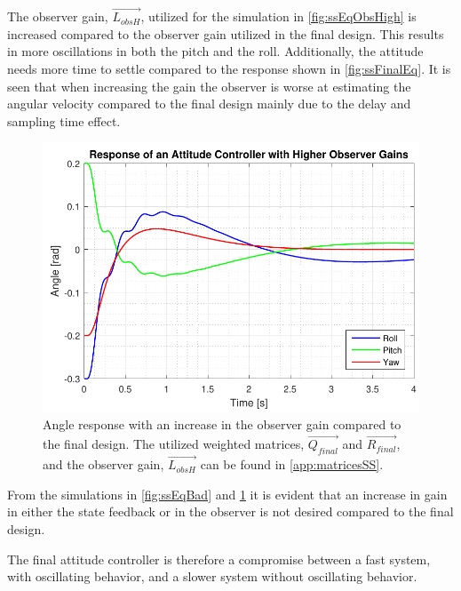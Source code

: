 The observer gain, $\vec{L_{obsH}}$, utilized for the simulation in  \autoref{fig:ssEqObsHigh} is increased compared to the observer gain utilized in the final design. This results in more oscillations in both the pitch and the roll. Additionally, the attitude needs more time to settle compared to the response shown in \autoref{fig:ssFinalEq}. It is seen that when increasing the gain the observer is worse at estimating the angular velocity compared to the final design mainly due to the delay and sampling time effect.
%
\begin{figure}[H]
	\centering
	\includegraphics[scale=0.7]{figures/ssEqObsHigh.pdf}
	\caption{Angle response with an increase in the observer gain compared to the final design. The utilized weighted matrices, $\vec{Q_{final}}$ and $\vec{R_{final}}$, and the observer gain, $\vec{L_{obsH}}$ can be found in \autoref{app:matricesSS}. }
	\label{fig:ssEqObsHigh}
\end{figure}
%
From the simulations in \autoref{fig:ssEqBad} and \ref{fig:ssEqObsHigh} it is evident that an increase in gain in either the state feedback or in the observer is not desired compared to the final design.

The final attitude controller is therefore a compromise between a fast system, with oscillating behavior, and a slower system without oscillating behavior.

